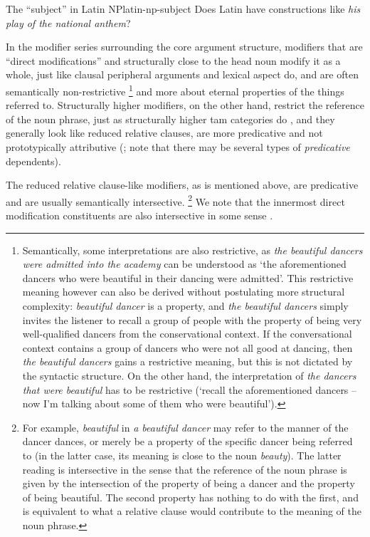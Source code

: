 \documentclass[a4paper, oneside, 12pt]{report}
\newcommand*{\citechap}[1]{chap.~{#1}}
\newcommand*{\citepage}[1]{p.~{#1}}
\newcommand*{\citepages}[1]{pp.~{#1}}
\newcommand*{\term}[1]{\emph{#1}}
\newcommand{\form}[1]{\emph{#1}}
\newcommand{\translate}[1]{`#1'}
\begin{document}
\begin{todobox}{The ``subject'' in Latin NP}{latin-np-subject}
    Does Latin have constructions like \form{his play of the national anthem}?
\end{todobox}

In the modifier series surrounding the core argument structure, 
modifiers that are ``direct modifications'' and structurally close to the head noun modify it as a whole,
just like clausal peripheral arguments and lexical aspect do,
and are often semantically non-restrictive%
\footnote{
    Semantically, some interpretations are also restrictive,
    as \form{the beautiful dancers were admitted into the academy}
    can be understood as \translate{the aforementioned dancers who were beautiful in their dancing were admitted}.
    This restrictive meaning however can also be derived without postulating more structural complexity:
    \form{beautiful dancer} is a property,
    and \form{the beautiful dancers} simply invites the listener to recall 
    a group of people with the property of being very well-qualified dancers from the conservational context.
    If the conversational context contains a group of dancers who were not all good at dancing,
    then \form{the beautiful dancers} gains a restrictive meaning,
    but this is not dictated by the syntactic structure. 
    On the other hand, the interpretation of \form{the dancers that were beautiful}
    has to be restrictive (\translate{recall the aforementioned dancers -- now I'm talking about some of them who were beautiful}).
}
and more about eternal properties of the things referred to.
Structurally higher modifiers, on the other hand, restrict the reference of the noun phrase,
just as structurally higher \ac{tam} categories do
\citep[\citepages{23,25}]{cinque2010syntax},
and they generally look like reduced relative clauses,
are more predicative and not prototypically attributive
(\citealt[\citechap{5}]{cinque2010syntax};
note that there may be several types of \term{predicative} dependents).

The reduced relative clause-like modifiers, as is mentioned above,
are predicative and are usually semantically intersective.%
\footnote{
    For example, \form{beautiful} in \form{a beautiful dancer}
    may refer to the manner of the dancer dances,
    or merely be a property of the specific dancer being referred to
    (in the latter case, its meaning is close to the noun \form{beauty}).
    The latter reading is intersective in the sense
    that the reference of the noun phrase is given by the intersection
    of the property of being a dancer and the property of being beautiful. 
    The second property has nothing to do with the first,
    and is equivalent to what a relative clause would contribute to the meaning of the noun phrase.
}
We note that the innermost direct modification constituents are also intersective in some sense 
\citep[\citepage{476}]{devine2006latin}.
\end{document}
